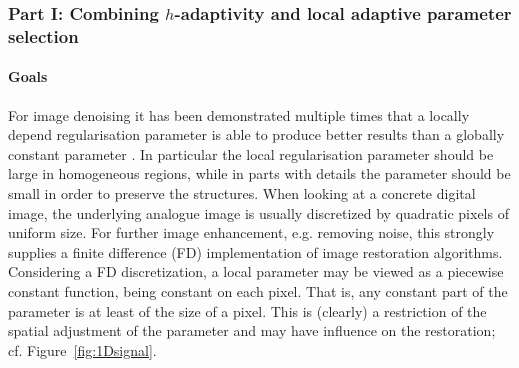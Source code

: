 \documentclass[enabledeprecatedfontcommands,cleardoublepage=empty,headsepline,twoside,11pt,DIV=15,BCOR=12mm,final]{scrartcl}
\begin{document}
\subsubsection{Part I: Combining $h$-adaptivity and local adaptive parameter selection}\label{Bereich1}

\paragraph{Goals}

For image denoising it has been demonstrated multiple times that a locally depend regularisation parameter is able to produce better results than a globally constant parameter \cite{}. In particular the local regularisation parameter should be large in homogeneous regions, while in parts with details the parameter should be small in order to preserve the structures. When looking at a concrete digital image, the underlying analogue image is usually discretized by quadratic pixels of uniform size. For further image enhancement, e.g. removing noise, this strongly supplies a finite difference (FD) implementation of image restoration algorithms. Considering a FD discretization, a local parameter may be viewed as a piecewise constant function, being constant on each pixel. That is, any constant part of the parameter is at least of the size of a pixel. This is (clearly) a restriction of the spatial adjustment of the parameter and may have influence on the restoration; cf. Figure~\ref{fig:1Dsignal}.
\end{document}
